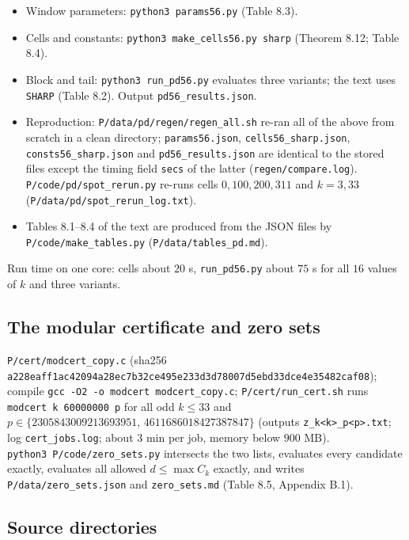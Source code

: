 \begin{itemize}
\tightlist
\item
  Window parameters: \texttt{python3\ params56.py} (Table 8.3).
\item
  Cells and constants: \texttt{python3\ make\_cells56.py\ sharp} (Theorem 8.12; Table 8.4).
\item
  Block and tail: \texttt{python3\ run\_pd56.py} evaluates three variants; the text uses \texttt{SHARP} (Table 8.2). Output \texttt{pd56\_results.json}.
\item
  Reproduction: \texttt{P/data/pd/regen/regen\_all.sh} re-ran all of the above from scratch in a clean directory; \texttt{params56.json}, \texttt{cells56\_sharp.json}, \texttt{consts56\_sharp.json} and \texttt{pd56\_results.json} are identical to the stored files except the timing field \texttt{secs} of the latter (\texttt{regen/compare.log}). \texttt{P/code/pd/spot\_rerun.py} re-runs cells \(0,100,200,311\) and \(k=3,33\) (\texttt{P/data/pd/spot\_rerun\_log.txt}).
\item
  Tables 8.1--8.4 of the text are produced from the JSON files by \texttt{P/code/make\_tables.py} (\texttt{P/data/tables\_pd.md}).
\end{itemize}

Run time on one core: cells about \(20\) s, \texttt{run\_pd56.py} about \(75\) s for all \(16\) values of \(k\) and three variants.

\subsection{The modular certificate and zero sets}\label{the-modular-certificate-and-zero-sets}

\texttt{P/cert/modcert\_copy.c} (sha256 \texttt{a228eaff1ac42094a28ec7b32ce495e233d3d78007d5ebd33dce4e35482caf08}); compile \texttt{gcc\ -O2\ -o\ modcert\ modcert\_copy.c}; \texttt{P/cert/run\_cert.sh} runs \texttt{modcert\ k\ 60000000\ p} for all odd \(k\le33\) and \(p\in\{2305843009213693951,\,4611686018427387847\}\) (outputs \texttt{z\_k\textless{}k\textgreater{}\_p\textless{}p\textgreater{}.txt}; log \texttt{cert\_jobs.log}; about \(3\) min per job, memory below \(900\) MB). \texttt{python3\ P/code/zero\_sets.py} intersects the two lists, evaluates every candidate exactly, evaluates all allowed \(d\le\max C_k\) exactly, and writes \texttt{P/data/zero\_sets.json} and \texttt{zero\_sets.md} (Table 8.5, Appendix B.1).

\subsection{Source directories}\label{source-directories}

